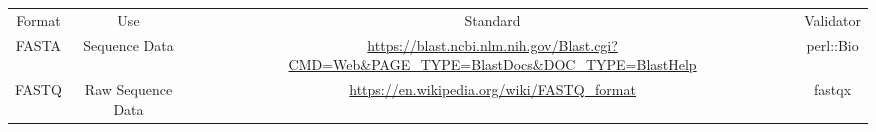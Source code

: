 \begin{tabular}{cccc}
{Format} & {Use} & {Standard} & {Validator} \\
FASTA & Sequence Data & \url{https://blast.ncbi.nlm.nih.gov/Blast.cgi?CMD=Web&PAGE_TYPE=BlastDocs&DOC_TYPE=BlastHelp} & perl::Bio \\
FASTQ & Raw Sequence Data & \url{https://en.wikipedia.org/wiki/FASTQ_format} & fastqx \\
\end{tabular}
